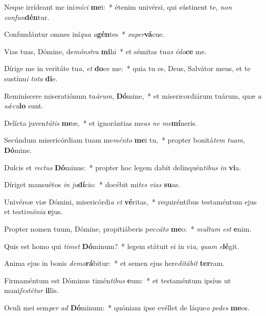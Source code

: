 \item Neque irrídeant me ini\textit{mí}\textit{ci} \textbf{me}i:~* étenim univérsi, qui sústinent te, \textit{non} \textit{con}\textit{fun}\textbf{dén}tur.
\item Confundántur omnes iní\textit{qua} \textit{a}\textbf{gén}tes~* \textit{su}\textit{per}\textbf{vá}cue.
\item Vias tuas, Dómine, de\textit{móns}\textit{tra} \textbf{mi}hi~* et sémitas tu\textit{as} \textit{é}\textit{do}\textbf{ce} me.
\item Dírige me in veritáte tu\textit{a}, \textit{et} \textbf{do}ce me:~* quia tu es, Deus, Salvátor meus, et te sustínu\textit{i} \textit{to}\textit{ta} \textbf{di}e.
\item Reminíscere miseratiónum tu\textit{á}\textit{rum}, \textbf{Dó}mine,~* et misericordiárum tuárum, quæ \textit{a} \textit{sǽ}\textit{cu}\textbf{lo} sunt.
\item Delícta juven\textit{tú}\textit{tis} \textbf{me}æ,~* et ignorántias me\textit{as} \textit{ne} \textit{me}\textbf{mí}neris.
\item Secúndum misericórdiam tuam me\textit{mén}\textit{to} \textbf{me}i tu,~* propter bonitá\textit{tem} \textit{tu}\textit{am}, \textbf{Dó}mine.
\item Dulcis et \textit{rec}\textit{tus} \textbf{Dó}minus:~* propter hoc legem dabit delinquén\textit{ti}\textit{bus} \textit{in} \textbf{vi}a.
\item Díriget mansuétos \textit{in} \textit{ju}\textbf{dí}cio:~* docébit mi\textit{tes} \textit{vi}\textit{as} \textbf{su}as.
\item Univérsæ viæ Dómini, misericórdi\textit{a} \textit{et} \textbf{vé}ritas,~* requiréntibus testaméntum ejus et testi\textit{mó}\textit{ni}\textit{a} \textbf{e}jus.
\item Propter nomen tuum, Dómine, propitiáberis pec\textit{cá}\textit{to} \textbf{me}o:~* \textit{mul}\textit{tum} \textit{est} \textbf{e}nim.
\item Quis est homo qui \textit{ti}\textit{met} \textbf{Dó}minum?~* legem státuit ei in vi\textit{a}, \textit{quam} \textit{e}\textbf{lé}git.
\item Anima ejus in bonis \textit{de}\textit{mo}\textbf{rá}bitur:~* et semen ejus here\textit{di}\textit{tá}\textit{bit} \textbf{ter}ram.
\item Firmaméntum est Dóminus timén\textit{ti}\textit{bus} \textbf{e}um:~* et testaméntum ipsíus ut mani\textit{fes}\textit{té}\textit{tur} \textbf{il}lis.
\item Oculi mei sem\textit{per} \textit{ad} \textbf{Dó}minum:~* quóniam ipse evéllet de láque\textit{o} \textit{pe}\textit{des} \textbf{me}os.
